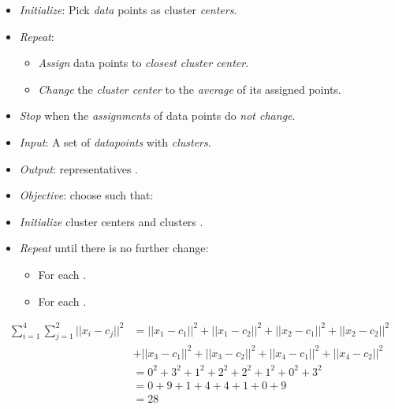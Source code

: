 \documentclass[
	number={6},
	title={Clustering}
]{cs584notes}
\begin{document}
\begin{itemize}
	\item \emph{Initialize}: Pick  \emph{data} points as cluster \emph{centers}.
	\item \emph{Repeat}:
	\begin{itemize}
		\item \emph{Assign} data points to \emph{closest cluster center}.
		\item \emph{Change} the \emph{cluster center} to the \emph{average} of its assigned points.
	\end{itemize}
	\item \emph{Stop} when the \emph{assignments} of data points do \emph{not change}.
	\item \emph{Input}: A set of  \emph{datapoints}  with  \emph{clusters}.
	\item \emph{Output}:  representatives .
	\item \emph{Objective}: choose  such that:
	\item \emph{Initialize} cluster centers  and clusters .
	\item \emph{Repeat} until there is no further change:
	\begin{itemize}
		\item For each .
		\item For each .
	\end{itemize}
\end{itemize}

\begin{equation*}
\begin{aligned}
	\sum_{i=1}^{4}\sum_{j=1}^{2} ||x_{i} - c_{j}||^{2} &= ||x_{1} - c_{1}||^{2} + ||x_{1} - c_{2}||^{2} + ||x_{2} - c_{1}||^{2} + ||x_{2} - c_{2}||^{2} \\&+ ||x_{3} - c_{1}||^{2} + ||x_{3} - c_{2}||^{2} + ||x_{4} - c_{1}||^{2} + ||x_{4} - c_{2}||^{2}\\
	&= 0^{2} + 3^{2} + 1^{2} + 2^{2} + 2^{2} + 1^{2} + 0^{2} + 3^{2}\\
	&= 0 + 9 + 1 + 4 + 4 + 1 + 0 + 9\\
	&= 28
\end{aligned}
\end{equation*}
\end{document}
